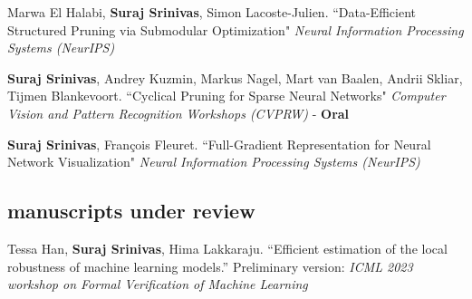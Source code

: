 \documentclass[11pt, a4paper, english]{moderncv}        %
\newcommand{\cvsection}[1]{\vspace{0.3cm}\subsection{\Large{{#1}}}}
\begin{document}
 {Marwa El Halabi, \textbf{Suraj Srinivas}, Simon Lacoste-Julien.
\newline ``Data-Efficient Structured Pruning via Submodular Optimization" \newline \textit{Neural Information Processing Systems (NeurIPS)}}

\vspace*{0.25em}
 {\textbf{Suraj Srinivas}, Andrey Kuzmin, Markus Nagel, Mart van Baalen, \newline Andrii Skliar, Tijmen Blankevoort. \newline ``Cyclical Pruning for Sparse Neural Networks" 
\newline \textit{Computer Vision and Pattern Recognition Workshops (CVPRW)} - \textbf{Oral}}

\vspace*{0.25em}

 {\textbf{Suraj Srinivas}, Fran\c{c}ois Fleuret. \newline ``Full-Gradient Representation
for Neural Network Visualization" \newline \textit{Neural Information Processing Systems (NeurIPS)}
}
\vspace*{0.25em}


\vspace*{0.25em}


\vspace*{0.25em}


\cvsection{manuscripts under review}

 {Tessa Han, \textbf{Suraj Srinivas}, Hima Lakkaraju. \newline ``Efficient estimation of the local robustness
of machine learning models.'' 
\newline Preliminary version: \textit{ICML 2023 workshop on Formal Verification of Machine Learning}}
\end{document}

